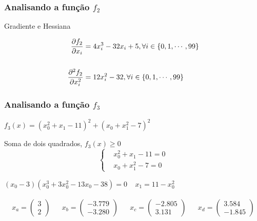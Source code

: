 \documentclass{beamer}
\newcommand{\fthree}{(x_0^2 + x_1 - 11)^2 + (x_0 + x_1^2 - 7)^2}
\begin{document}
\begin{frame}
\frametitle{Analisando a função $f_2$}
Gradiente e Hessiana

\begin{align*}
	\frac{\partial f_2}{\partial x_i}     &= 4 x_i^3 - 32 x_i + 5, \forall i \in \left\{0, 1, \cdots, 99\right\} \\
	\vspace{0.5in} \\
	\frac{\partial^2 f_2}{\partial x_i^2} &= 12 x_i^2 - 32, \forall i \in \left\{0, 1, \cdots, 99\right\}
\end{align*}

\end{frame}

\begin{frame}
\frametitle{Analisando a função $f_3$}
$f_3(x) = \fthree$

Soma de dois quadrados, $f_3(x) \geq 0$ \pause
\begin{equation*}
\left\{
	\begin{aligned}
		& x_0^2 + x_1 - 11 = 0 \\
		& x_0 + x_1^2 - 7 = 0
	\end{aligned}	
\right.
\end{equation*} \pause
\begin{center}
	$(x_0 - 3)(x_0^3 + 3x_0^2 - 13x_0 -38) = 0 \ \ \ \ \ x_1 = 11 - x_0^2$
\end{center}
\begin{align*}
	x_a = \begin{pmatrix}
		3 \\
		2
	\end{pmatrix}
	&&
	x_b = \begin{pmatrix}
		-3.779 \\
		-3.280
	\end{pmatrix}
	&&
	x_c = \begin{pmatrix}
		-2.805 \\
		3.131
	\end{pmatrix}
	&&
	x_d = \begin{pmatrix}
		3.584 \\
		-1.845
	\end{pmatrix}
\end{align*}
\end{frame}
\end{document}
